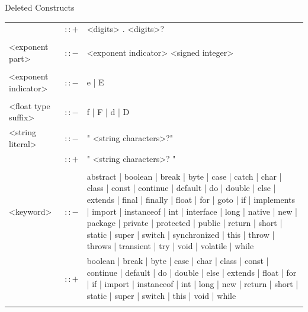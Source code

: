 \documentclass[landscape, 11pt]{article}
\begin{document}
\begin{qsection}{Deleted Constructs}
\begin{enumerate}[label=\bt{\theenumi.}]
\begin{longtable}{R{7cm} c L{15cm}}
															&	$\colon\colon+$	&	<digits> . <digits>? \\\\
				<exponent part>								&	$\colon\colon-$	&	<exponent indicator> <signed integer> \\\\
				<exponent indicator>						&	$\colon\colon-$	&	e | E \\\\
				<float type suffix>							&	$\colon\colon-$	&	f | F | d | D \\
				<string literal>							&	$\colon\colon-$	&	" <string characters>?" \\
															&	$\colon\colon+$	&	" <string characters>? " \\\\
				<keyword>									&	$\colon\colon-$	&	abstract | boolean | break | byte | case | catch | char | class | const | continue | default | do | double | else | extends | final | finally | float | for | goto | if | implements | import | instanceof | int | interface | long | native | new | package | private | protected | public | return | short | static | super | switch | synchronized | this | throw | throws | transient | try | void | volatile | while \\
															&	$\colon\colon+$	&	boolean | break | byte | case | char | class | const | continue | default | do | double | else | extends | float | for | if | import | instanceof | int | long | new | return | short | static | super | switch | this | void | while \\\\
		\end{longtable}

	\end{enumerate}


\end{qsection}
\end{document}
